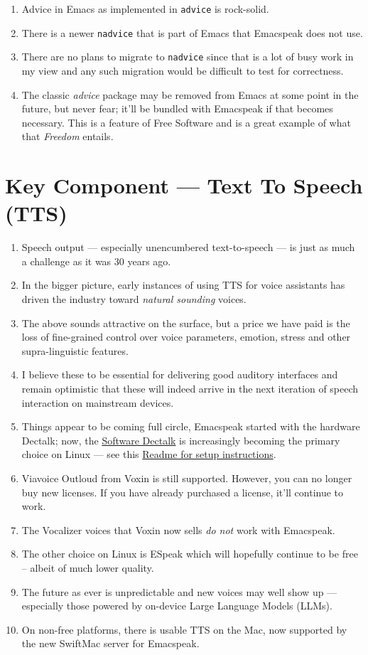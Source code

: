 \documentclass[11pt]{article}
\begin{document}
\begin{enumerate}
\item Advice in Emacs as implemented in \texttt{advice} is rock-solid.
\item There is a newer \texttt{nadvice} that is part of Emacs that Emacspeak
does not use.

\item There are no plans to migrate to \texttt{nadvice} since that is a lot of
busy work in my view and any such migration would be difficult
to test for correctness.
\item The classic \emph{advice} package may be removed from Emacs at some
point in the future, but never fear; it'll be bundled with
Emacspeak if that becomes necessary. This is a feature of Free Software and is a great
example of what that \emph{Freedom} entails.
\end{enumerate}
\section{Key Component —  Text To Speech (TTS)}
\label{sec:orgf393f62}

\begin{enumerate}
\item Speech output --- especially unencumbered text-to-speech --- is just
as much a challenge as it was 30 years ago.
\item In the bigger picture, early instances of using TTS for voice
assistants has driven the industry toward \emph{natural sounding} voices.
\item The above sounds attractive on the surface, but a price we have
paid is the  loss of fine-grained control over voice parameters,
emotion, stress and other supra-linguistic features.
\item I  believe  these to be essential for delivering
good auditory interfaces and   remain optimistic that
these will indeed arrive in the next iteration of speech
interaction on mainstream devices.
\item Things appear to be coming full circle, Emacspeak started with
the hardware Dectalk; now, the \href{https://github.com/dectalk/dectalk.git}{Software Dectalk} is increasingly
becoming the primary choice on Linux --- see this  \href{https://raw.githubusercontent.com/tvraman/emacspeak/master/servers/software-dtk/Readme.org}{Readme for setup instructions}.
\item Viavoice Outloud from Voxin is still supported.  However,
you can no longer buy new licenses. If you have already purchased
a license, it'll
continue to work.
\item The  Vocalizer voices that Voxin now sells \emph{do not} work with Emacspeak.
\item The  other choice on Linux is ESpeak which will hopefully
continue to be free -- albeit of much lower quality.
\item The future as ever is unpredictable and new voices may well show
up --- especially those powered by on-device Large Language
Models (LLMs).

\item On non-free platforms, there is usable TTS on the Mac, now
supported by the new SwiftMac server for Emacspeak.
\end{enumerate}
\end{document}
